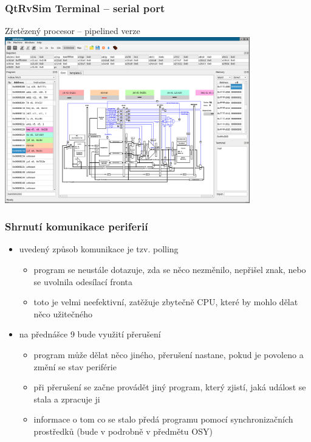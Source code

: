 \documentclass{beamer}
\begin{document}
\begin{frame}
\frametitle{QtRvSim Terminal -- serial port}
\begin{center}
Zřetězený procesor -- pipelined verze
\includegraphics[width=0.8\textwidth]{fig/QtRvSim-serial-pipeline.png}
\end{center}
\end{frame}

\begin{frame}
\frametitle{Shrnutí komunikace periferií}

\begin{itemize}
\item uvedený způsob komunikace je tzv. polling
\begin{itemize}
\item program se neustále dotazuje, zda se něco nezměnilo, nepřišel znak, nebo se uvolnila odesílací fronta
\item toto je velmi neefektivní, zatěžuje zbytečně CPU, které by mohlo dělat něco užitečného
\end{itemize}
\item na přednášce 9 bude využití přerušení
\begin{itemize}
\item program může dělat něco jiného, přerušení nastane, pokud je povoleno a změní se stav periférie
\item při přerušení se začne provádět jiný program, který zjistí, jaká událost se stala a zpracuje ji
\item informace o tom co se stalo předá programu pomocí synchronizačních prostředků (bude v podrobně v předmětu OSY)
\end{itemize}
\end{itemize}

\end{frame}
\end{document}
